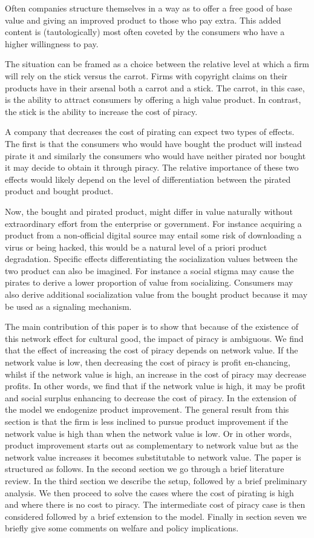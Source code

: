 \documentclass[12pt]{report}
\numberwithin{equation}{section}
\begin{document}
Often companies structure themselves in a way as to offer a free good of base value and giving an improved product to those who pay extra. This added content is (tautologically) most often coveted by the consumers who have a higher willingness to pay.

The situation can be framed as a choice between the relative level at which a firm will rely on the stick versus the carrot. Firms with copyright claims on their products have in their arsenal both a carrot and a stick. The carrot, in this case, is the ability to attract consumers by offering a high value product. In contrast, the stick is the ability to increase the cost of piracy.

A company that decreases the cost of pirating can expect two types of effects. The first is that the consumers who would have bought the product will instead pirate it and similarly the consumers who would have neither pirated nor bought it may decide to obtain it through piracy. The relative importance of these two effects would likely depend on the level of differentiation between the pirated product and bought product.

Now, the bought and pirated product, might differ in value naturally without extraordinary effort from the enterprise or government. For instance acquiring a product from a non-official digital source may entail some risk of downloading a virus or being hacked, this would be a natural level of a priori product degradation. Specific effects differentiating the socialization values between the two product can also be imagined. For instance a social stigma may cause the pirates to derive a lower proportion of value from socializing. Consumers may also derive additional socialization value from the bought product because it may be used as a signaling mechanism.

The main contribution of this paper is to show that because of the existence of this network effect for cultural good, the impact of piracy is ambiguous. We find that the effect of increasing the cost of piracy depends on network value. If the network value is low, then decreasing the cost of piracy is profit en-chancing, whilst if the network value is high, an increase in the cost of piracy may decrease profits. In other words, we find that if the network value is high, it may be profit and social surplus enhancing to decrease the cost of piracy. In the extension of the model we endogenize product improvement. The general result from this section is that the firm is less inclined to pursue product improvement if the network value is high than when the network value is low. Or in other words, product improvement starts out as complementary to network value but as the network value increases it becomes substitutable to network value.  The paper is structured as follows. In the second section we go through a brief literature review. In the third section we describe the setup, followed by a brief preliminary analysis. We then proceed to solve the cases where the cost of pirating is high and where there is no cost to piracy. The intermediate cost of piracy case is then considered followed by a brief extension to the model. Finally in section seven we briefly give some comments on welfare and policy implications.
\end{document}
